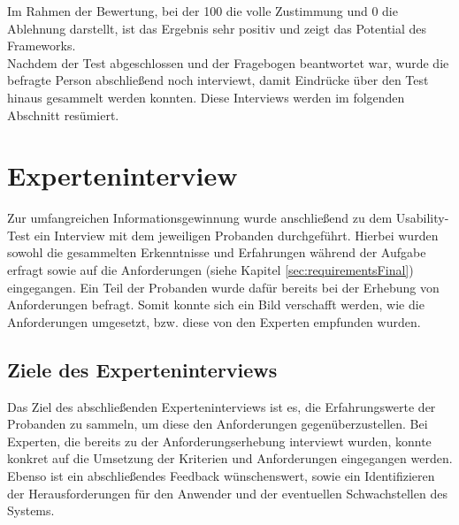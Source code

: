        Im Rahmen der Bewertung, bei der 100 die volle Zustimmung und 0 die Ablehnung darstellt, ist das Ergebnis 
        sehr positiv und zeigt das Potential des Frameworks. 
        \\
        Nachdem der Test abgeschlossen und der Fragebogen beantwortet war, wurde die befragte Person abschließend noch interviewt, damit 
        Eindrücke über den Test hinaus gesammelt werden konnten. Diese Interviews werden im folgenden Abschnitt resümiert. 

\section{Experteninterview}
        Zur umfangreichen Informationsgewinnung wurde anschließend zu dem Usability-Test ein Interview mit dem jeweiligen Probanden 
        durchgeführt. Hierbei wurden sowohl die gesammelten Erkenntnisse und Erfahrungen während der Aufgabe erfragt sowie auf die Anforderungen 
        (siehe Kapitel \ref{sec:requirementsFinal}) eingegangen. Ein Teil der Probanden wurde dafür bereits 
        bei der Erhebung von Anforderungen befragt. Somit konnte sich ein Bild verschafft werden, wie die Anforderungen 
        umgesetzt, bzw. diese von den Experten empfunden wurden.
    
    \subsection{Ziele des Experteninterviews}
        Das Ziel des abschließenden Experteninterviews ist es, die Erfahrungswerte der Probanden zu sammeln, um diese den Anforderungen gegenüberzustellen. Bei 
        Experten, die bereits zu der Anforderungserhebung interviewt wurden, konnte konkret auf die Umsetzung der Kriterien und Anforderungen eingegangen werden. 
        Ebenso ist ein abschließendes Feedback wünschenswert, sowie ein Identifizieren der Herausforderungen für den Anwender und der eventuellen Schwachstellen 
        des Systems. 

